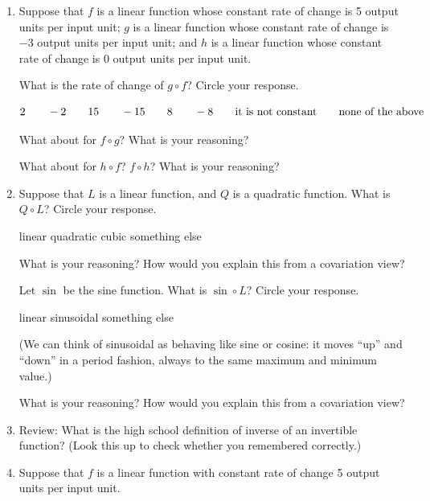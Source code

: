\documentclass[11pt]{article}
\newcommand\tn{\textnormal}
\theoremstyle{definition}
\begin{document}
\begin{enumerate}
\item 
Suppose that $f$ is a linear function whose constant rate of change is 5 output units per input unit; $g$ is a linear function whose constant rate of change is $-3$ output units per input unit; and $h$ is a linear function whose constant rate of change is $0$ output units per input unit.

What is the rate of change of $g\circ f$? Circle your response.

	$$2 \quad\quad -2 \quad\quad 15 \quad\quad -15 \quad\quad 8 \quad\quad -8\quad\quad \tn{it is not constant} \quad\quad \tn{none of the above}$$

What about for $f\circ g$? What is your reasoning? 

What about for $h\circ f$?  $f\circ h$? What is your reasoning?

\vfill 

\item Suppose that $L$ is a linear function, and $Q$ is a quadratic function.  What is $Q\circ L$? Circle your response.

\vspace*{-12pt}
\begin{center}
linear \quad\quad quadratic \quad\quad cubic \quad\quad something else
\end{center}

What is your reasoning? How would you explain this from a covariation view?

Let $\sin$ be the sine function. What is $\sin\circ L$? Circle your response.

\begin{center}
linear \quad\quad sinusoidal \quad\quad something else
\end{center}

(We can think of sinusoidal as behaving like sine or cosine: it moves ``up'' and ``down'' in a period fashion, always to the same maximum and minimum value.)

What is your reasoning? How would you explain this from a covariation view?

\vfill 

\item Review: What is the high school definition of inverse of an invertible function? (Look this up to check whether you remembered correctly.)

\vfill 
\item Suppose that $f$ is a linear function with constant rate of change 5 output units per input unit. 


\end{enumerate}
\end{document}
